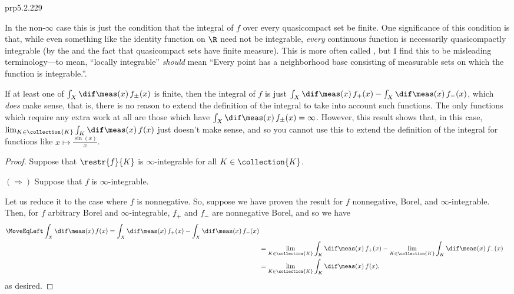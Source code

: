 \begin{thm}{}{prp5.2.229}
\begin{rmk}
In the non-$\infty$ case this is just the condition that the integral of $f$ over every quasicompact set be finite.  One significance of this condition is that, while even something like the identity function on $\R$ need not be integrable, \emph{every} continuous function is necessarily quasicompactly integrable (by the  and the fact that quasicompact sets have finite measure).  This is more often called , but I find this to be misleading terminology---to mean, ``locally integrable'' \emph{should} mean ``Every point has a neighborhood base consisting of measurable sets on which the function is integrable.''.
\end{rmk}
\begin{rmk}
If at least one of $\int _X\dif \meas (x)\, f_{\pm}(x)$ is finite, then the integral of $f$ is just $\int _X\dif \meas (x)\, f_+(x)-\int _X\dif \meas (x)\, f_-(x)$, which \emph{does} make sense, that is, there is no reason to extend the definition of the integral to take into account such functions.  The only functions which require any extra work at all are those which have $\int _X\dif \meas (x)\, f_{\pm}(x)=\infty$.  However, this result shows that, in this case, $\lim _{K\in \collection{K}}\int _K\dif \meas (x)\, f(x)$ just doesn't make sense, and so you cannot use this to extend the definition of the integral for functions like $x\mapsto \frac{\sin (x)}{x}$.
\end{rmk}
\begin{proof}
Suppose that $\restr{f}{K}$ is $\infty$-integrable for all $K\in \collection{K}$.

\blankline
\noindent
$(\Rightarrow )$ Suppose that $f$ is $\infty$-integrable.

Let us reduce it to the case where $f$ is nonnegative.  So, suppose we have proven the result for $f$ nonnegative, Borel, and $\infty$-integrable.  Then, for $f$ arbitrary Borel and $\infty$-integrable, $f_+$ and $f_-$ are nonnegative Borel, and so we have
\begin{equation*}
\begin{split}
\MoveEqLeft
\int _X\dif \meas (x)\, f(x)=\int _X\dif \meas (x)\, f_+(x)-\int _X\dif \meas (x)\, f_-(x) \\
& =\lim _{K\in \collection{K}}\int _K\dif \meas (x)\, f_+(x)-\lim _{K\in \collection{K}}\int _K\dif \meas (x)\, f_-(x) \\
& =\lim _{K\in \collection{K}}\int _K\dif \meas (x)\, f(x),
\end{split}
\end{equation*}
as desired.


\end{proof}
\end{thm}
